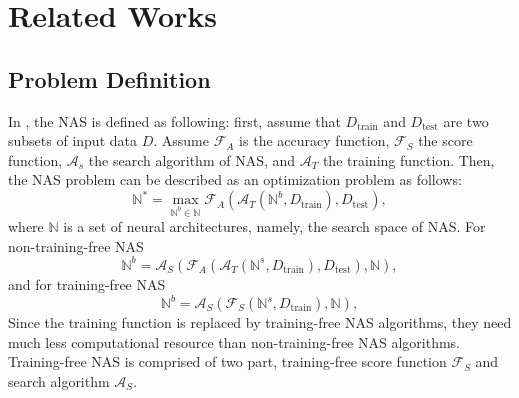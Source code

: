 \documentclass[sigconf]{acmart}
\begin{document}
    \section{Related Works}
    \label{sec:related_work}
    \subsection{Problem Definition}
    In \cite{10092788}, the NAS is defined as following: 
    first, assume that $D_{\text{train}}$ and $D_{\text{test}}$ are two subsets of input data $D$. 
    Assume $\mathcal F_A$ is the accuracy function, $\mathcal F_S$ the score function, $\mathcal A_s$ the 
    search algorithm of NAS, and $\mathcal A_T$ the training function. Then, the NAS problem can be 
    described as an optimization problem as follows: 
    \begin{equation}
        \label{equ:nas}
        \mathbb N^*=\max_{\mathbb N^b\in\mathbb N}\mathcal F_A(\mathcal A_T(\mathbb N^b, D_{\text{train}}), D_{\text{test}}),
    \end{equation}
    where $\mathbb N$ is a set of neural architectures, namely, the search space of NAS. 
    For non-training-free NAS 
    \begin{equation}
        \label{equ:non-training_free_nas}
        \mathbb N^b=\mathcal A_S(\mathcal F_A(\mathcal A_T(\mathbb N^s, D_{\text{train}}), D_{\text{test}}), \mathbb N),
    \end{equation}
    and for training-free NAS 
    \begin{equation}
        \label{equ:training_free_nas}
        \mathbb N^b=\mathcal A_S(\mathcal F_S(\mathbb N^s, D_{\text{train}}), \mathbb N),
    \end{equation}
    Since the training function is replaced by training-free NAS algorithms, they need much less 
    computational resource than non-training-free NAS algorithms. 
    Training-free NAS is comprised of two part, training-free score function $\mathcal F_S$ and 
    search algorithm $\mathcal A_S$. 
\end{document}

